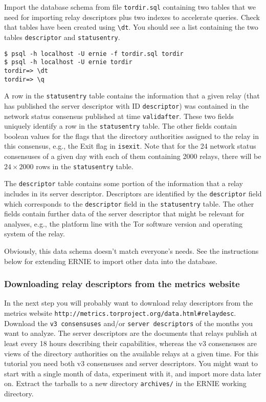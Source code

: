 \documentclass{article}
\begin{document}
Import the database schema from file \verb+tordir.sql+ containing two
tables that we need for importing relay descriptors plus two indexes to
accelerate queries. Check that tables have been created using \verb+\dt+.
You should see a list containing the two tables \verb+descriptor+ and
\verb+statusentry+.

\begin{verbatim}
$ psql -h localhost -U ernie -f tordir.sql tordir
$ psql -h localhost -U ernie tordir
tordir=> \dt
tordir=> \q
\end{verbatim}

A row in the \verb+statusentry+ table contains the information that a
given relay (that has published the server descriptor with ID
\verb+descriptor+) was contained in the network status consensus published
at time \verb+validafter+.
These two fields uniquely identify a row in the \verb+statusentry+ table.
The other fields contain boolean values for the flags that the directory
authorities assigned to the relay in this consensus, e.g., the Exit flag
in \verb+isexit+.
Note that for the 24 network status consensuses of a given day with each
of them containing 2000 relays, there will be $24 \times 2000$ rows in the
\verb+statusentry+ table.

The \verb+descriptor+ table contains some portion of the information that
a relay includes in its server descriptor.
Descriptors are identified by the \verb+descriptor+ field which
corresponds to the \verb+descriptor+ field in the \verb+statusentry+
table.
The other fields contain further data of the server descriptor that might
be relevant for analyses, e.g., the platform line with the Tor software
version and operating system of the relay.

Obviously, this data schema doesn't match everyone's needs.
See the instructions below for extending ERNIE to import other data into
the database.

\subsubsection{Downloading relay descriptors from the metrics website}

In the next step you will probably want to download relay descriptors from
the metrics website
\verb+http://metrics.torproject.org/data.html#relaydesc+.
Download the \verb+v3 consensuses+ and/or \verb+server descriptors+ of the
months you want to analyze.
The server descriptors are the documents that relays publish at least
every 18 hours describing their capabilities, whereas the v3 consensuses
are views of the directory authorities on the available relays at a given
time.
For this tutorial you need both v3 consensuses and server descriptors.
You might want to start with a single month of data, experiment with it,
and import more data later on.
Extract the tarballs to a new directory \verb+archives/+ in the ERNIE
working directory.
\end{document}
